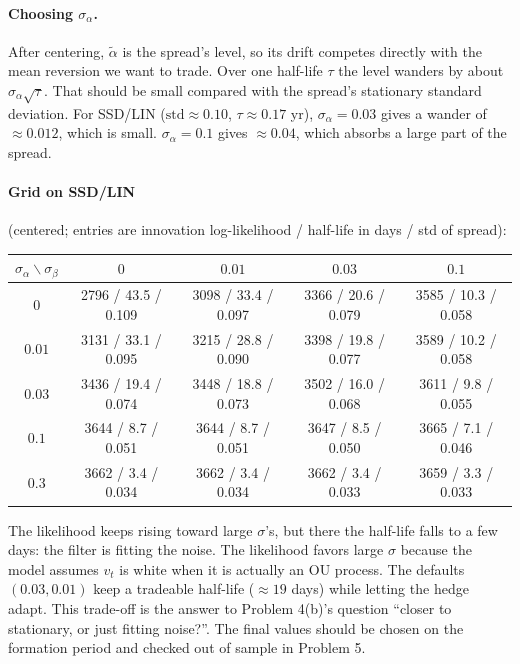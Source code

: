 \documentclass[11pt]{article}
\begin{document}
\paragraph{Choosing $\sigma_\alpha$.} After centering, $\tilde\alpha$ is the
spread's level, so its drift competes directly with the mean reversion we want
to trade. Over one half-life $\tau$ the level wanders by about
$\sigma_\alpha\sqrt{\tau}$. That should be small compared with the spread's
stationary standard deviation. For SSD/LIN ($\text{std} \approx 0.10$,
$\tau \approx 0.17$ yr), $\sigma_\alpha = 0.03$ gives a wander of $\approx
0.012$, which is small. $\sigma_\alpha = 0.1$ gives $\approx 0.04$, which
absorbs a large part of the spread.

\paragraph{Grid on SSD/LIN} (centered; entries are innovation log-likelihood /
half-life in days / std of spread):
\begin{center}
\small
\begin{tabular}{ccccc}
    \toprule
    $\sigma_\alpha \backslash \sigma_\beta$ & $0$ & $0.01$ & $0.03$ & $0.1$ \\
    \midrule
    $0$    & 2796 / 43.5 / 0.109 & 3098 / 33.4 / 0.097 & 3366 / 20.6 / 0.079 & 3585 / 10.3 / 0.058 \\
    $0.01$ & 3131 / 33.1 / 0.095 & 3215 / 28.8 / 0.090 & 3398 / 19.8 / 0.077 & 3589 / 10.2 / 0.058 \\
    $0.03$ & 3436 / 19.4 / 0.074 & 3448 / 18.8 / 0.073 & 3502 / 16.0 / 0.068 & 3611 / 9.8 / 0.055 \\
    $0.1$  & 3644 / 8.7 / 0.051  & 3644 / 8.7 / 0.051  & 3647 / 8.5 / 0.050  & 3665 / 7.1 / 0.046 \\
    $0.3$  & 3662 / 3.4 / 0.034  & 3662 / 3.4 / 0.034  & 3662 / 3.4 / 0.033  & 3659 / 3.3 / 0.033 \\
    \bottomrule
\end{tabular}
\end{center}
The likelihood keeps rising toward large $\sigma$'s, but there the half-life
falls to a few days: the filter is fitting the noise. The likelihood favors
large $\sigma$ because the model assumes $v_t$ is white when it is actually an
OU process. The defaults $(0.03, 0.01)$ keep a tradeable half-life
($\approx 19$ days) while letting the hedge adapt. This trade-off is the
answer to Problem 4(b)'s question ``closer to stationary, or just fitting
noise?''. The final values should be chosen on the formation period and
checked out of sample in Problem 5.
\end{document}

